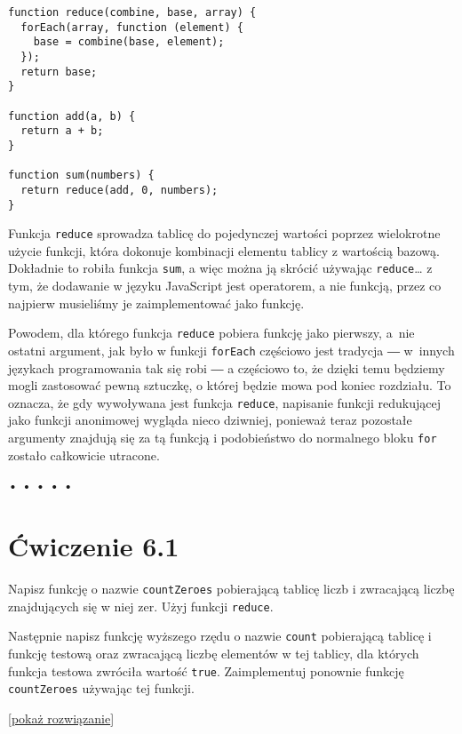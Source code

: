   
\begin{verbatim} 
function reduce(combine, base, array) {
  forEach(array, function (element) {
    base = combine(base, element);
  });
  return base;
}

function add(a, b) {
  return a + b;
}

function sum(numbers) {
  return reduce(add, 0, numbers);
}
 \end{verbatim}
  
Funkcja \texttt{reduce} sprowadza tablicę do pojedynczej wartości poprzez wielokrotne użycie funkcji, która dokonuje kombinacji elementu tablicy z wartością bazową. Dokładnie to robiła funkcja \texttt{sum}, a więc można ją skrócić używając \texttt{reduce}… z tym, że dodawanie w języku JavaScript jest operatorem, a nie funkcją, przez co najpierw musieliśmy je zaimplementować jako funkcję.

  
Powodem, dla którego funkcja \texttt{reduce} pobiera funkcję jako pierwszy, a~nie ostatni argument, jak było w funkcji \texttt{forEach} częściowo jest tradycja ― w~innych językach programowania tak się robi ― a częściowo to, że dzięki temu będziemy mogli zastosować pewną sztuczkę, o której będzie mowa pod koniec rozdziału. To oznacza, że gdy wywoływana jest funkcja \texttt{reduce}, napisanie funkcji redukującej jako funkcji anonimowej wygląda nieco dziwniej, ponieważ teraz pozostałe argumenty znajdują się za tą funkcją i podobieństwo do normalnego bloku \texttt{for} zostało całkowicie utracone.



\begin{center}
• • • • •
\end{center}

  
\section*{Ćwiczenie 6.1}
\label{sec:6.1}
  
    
Napisz funkcję o nazwie \texttt{countZeroes} pobierającą tablicę liczb i zwracającą liczbę znajdujących się w niej zer. Użyj funkcji \texttt{reduce}.

    
Następnie napisz funkcję wyższego rzędu o nazwie \texttt{count} pobierającą tablicę i funkcję testową oraz zwracającą liczbę elementów w tej tablicy, dla których funkcja testowa zwróciła wartość \texttt{true}. Zaimplementuj ponownie funkcję \texttt{countZeroes} używając tej funkcji.

  
[\hyperref[sol:6.1]{pokaż rozwiązanie}]
  


